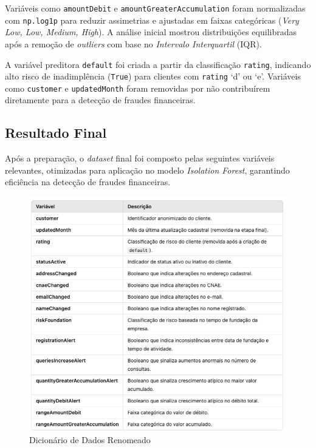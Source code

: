 \documentclass[12pt,a4paper]{article}
\begin{document}
Variáveis como \texttt{amountDebit} e \texttt{amountGreaterAccumulation} foram normalizadas com \texttt{np.log1p} para reduzir assimetrias e ajustadas em faixas categóricas (\textit{Very Low, Low, Medium, High}). A análise inicial mostrou distribuições equilibradas após a remoção de \textit{outliers} com base no \textit{Intervalo Interquartil} (IQR).

A variável preditora \texttt{default} foi criada a partir da classificação \texttt{rating}, indicando alto risco de inadimplência (\texttt{True}) para clientes com \texttt{rating} `d' ou `e'. Variáveis como \texttt{customer} e \texttt{updatedMonth} foram removidas por não contribuírem diretamente para a detecção de fraudes financeiras.

\subsection{Resultado Final}

Após a preparação, o \textit{dataset} final foi composto pelas seguintes variáveis relevantes, otimizadas para aplicação no modelo \textit{Isolation Forest}, garantindo eficiência na detecção de fraudes financeiras.

\begin{figure}
    \centering
    \includegraphics[width=\textwidth]{dicionariodedados2.png}
    \caption{Dicionário de Dados Renomeado}
    \label{fig:dicionario_dados}
\end{figure}




\newpage

\end{document}
